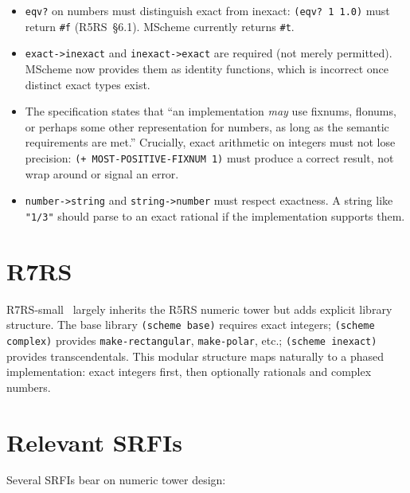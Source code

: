 \documentclass[12pt]{report}
\begin{document}
\begin{itemize}
\item {\tt eqv?} on numbers must distinguish exact from inexact:
  {\tt (eqv?\ 1\ 1.0)} must return {\tt \#f} (R5RS~\S6.1).
  MScheme currently returns {\tt \#t}.

\item {\tt exact->inexact} and {\tt inexact->exact} are required
  (not merely permitted).  MScheme now provides them as identity
  functions, which is incorrect once distinct exact types exist.

\item The specification states that ``an implementation \emph{may}
  use fixnums, flonums, or perhaps some other representation for
  numbers, as long as the semantic requirements are met.''  Crucially,
  exact arithmetic on integers must not lose precision:
  {\tt (+\ \mbox{MOST-POSITIVE-FIXNUM}\ 1)} must produce a correct
  result, not wrap around or signal an error.

\item {\tt number->string} and {\tt string->number} must respect
  exactness.  A string like {\tt "1/3"} should parse to an exact
  rational if the implementation supports them.
\end{itemize}

\section{R7RS}

R7RS-small~\cite{r7rs} largely inherits the R5RS numeric tower but
adds explicit library structure.  The base library {\tt (scheme base)}
requires exact integers; {\tt (scheme complex)} provides
{\tt make-rectangular}, {\tt make-polar}, etc.; {\tt (scheme inexact)}
provides transcendentals.  This modular structure maps naturally to a
phased implementation: exact integers first, then optionally rationals
and complex numbers.

\section{Relevant SRFIs}

Several SRFIs bear on numeric tower design:
\end{document}
